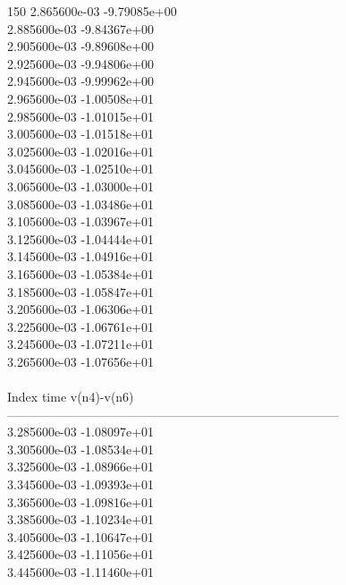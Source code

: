 150	2.865600e-03	-9.79085e+00	\\ 	2.885600e-03	-9.84367e+00	\\ 	2.905600e-03	-9.89608e+00	\\ 	2.925600e-03	-9.94806e+00	\\ 	2.945600e-03	-9.99962e+00	\\ 	2.965600e-03	-1.00508e+01	\\ 	2.985600e-03	-1.01015e+01	\\ 	3.005600e-03	-1.01518e+01	\\ 	3.025600e-03	-1.02016e+01	\\ 	3.045600e-03	-1.02510e+01	\\ 	3.065600e-03	-1.03000e+01	\\ 	3.085600e-03	-1.03486e+01	\\ 	3.105600e-03	-1.03967e+01	\\ 	3.125600e-03	-1.04444e+01	\\ 	3.145600e-03	-1.04916e+01	\\ 	3.165600e-03	-1.05384e+01	\\ 	3.185600e-03	-1.05847e+01	\\ 	3.205600e-03	-1.06306e+01	\\ 	3.225600e-03	-1.06761e+01	\\ 	3.245600e-03	-1.07211e+01	\\ 	3.265600e-03	-1.07656e+01	\\ \hline
\\ \hline
Index   time            v(n4)-v(n6)     \\ \hline
--------------------------------------------------------------------------------\\ 	3.285600e-03	-1.08097e+01	\\ 	3.305600e-03	-1.08534e+01	\\ 	3.325600e-03	-1.08966e+01	\\ 	3.345600e-03	-1.09393e+01	\\ 	3.365600e-03	-1.09816e+01	\\ 	3.385600e-03	-1.10234e+01	\\ 	3.405600e-03	-1.10647e+01	\\ 	3.425600e-03	-1.11056e+01	\\ 	3.445600e-03	-1.11460e+01	\\ \hline
